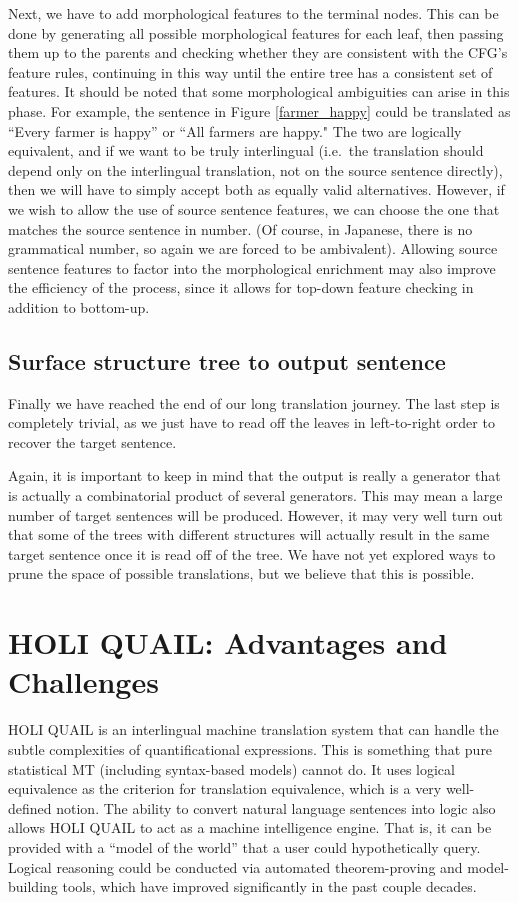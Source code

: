 \documentclass[11pt, oneside]{article}      %
\begin{document}
Next, we have to add morphological features to the terminal nodes.  This can be done by generating all possible morphological features for each leaf, then passing them up to the parents and checking whether they are consistent with the CFG's feature rules, continuing in this way until the entire tree has a consistent set of features.  It should be noted that some morphological ambiguities can arise in this phase.  For example, the sentence in Figure \ref{farmer_happy} could be translated as ``Every farmer is happy'' or ``All farmers are happy."  The two are logically equivalent, and if we want to be truly interlingual (i.e.\ the translation should depend only on the interlingual translation, not on the source sentence directly), then we will have to simply accept both as equally valid alternatives.  However, if we wish to allow the use of source sentence features, we can choose the one that matches the source sentence in number.  (Of course, in Japanese, there is no grammatical number, so again we are forced to be ambivalent).  Allowing source sentence features to factor into the morphological enrichment may also improve the efficiency of the process, since it allows for top-down feature checking in addition to bottom-up.

\subsection{Surface structure tree to output sentence}

Finally we have reached the end of our long translation journey.  The last step is completely trivial, as we just have to read off the leaves in left-to-right order to recover the target sentence.

Again, it is important to keep in mind that the output is really a generator that is actually a combinatorial product of several generators.  This may mean a large number of target sentences will be produced.  However, it may very well turn out that some of the trees with different structures will actually result in the same target sentence once it is read off of the tree.  We have not yet explored ways to prune the space of possible translations, but we believe that this is possible.

\section{HOLI QUAIL: Advantages and Challenges}

HOLI QUAIL is an interlingual machine translation system that can handle the subtle complexities of quantificational expressions.  This is something that pure statistical MT (including syntax-based models) cannot do.  It uses logical equivalence as the criterion for translation equivalence, which is a very well-defined notion.  The ability to convert natural language sentences into logic also allows HOLI QUAIL to act as a machine intelligence engine.  That is, it can be provided with a ``model of the world'' that a user could hypothetically query.  Logical reasoning could be conducted via automated theorem-proving and model-building tools, which have improved significantly in the past couple decades.
\end{document}
